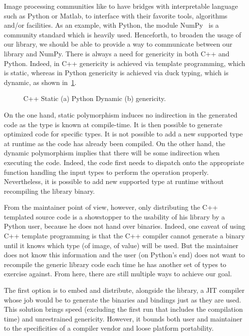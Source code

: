 Image processing communities like to have bridges with interpretable language such as Python or Matlab, to interface
with their favorite tools, algorithms and/or facilities. As an example, with Python, the module
NumPy~\parencite{harris.2020.numpy} is a community standard which is heavily used. Henceforth, to broaden the usage of
our library, we should be able to provide a way to communicate between our library and NumPy. There is always a need for
genericity in both C++ and Python. Indeed, in C++ genericity is achieved via template programming, which is static,
whereas in Python genericity is achieved via duck typing, which is dynamic, as shown
in~\cref{fig:static.vs.dynamic.genericity}.

\begin{figure}[htbp]
  \centering
  \hfil
  \caption{C++ Static (a) \vs Python Dynamic (b) genericity.}
  \label{fig:static.vs.dynamic.genericity}
\end{figure}

On the one hand, static polymorphism induces no indirection in the generated code as the type is known at compile-time.
It is then possible to generate optimized code for specific types. It is not possible to add a new supported type at
runtime as the code has already been compiled. On the other hand, the dynamic polymorphism implies that there will be
some indirection when executing the code. Indeed, the code first needs to dispatch onto the appropriate function
handling the input types to perform the operation properly. Nevertheless, it is possible to add new supported type at
runtime without recompiling the library binary.

From the maintainer point of view, however, only distributing the C++ templated source code is a showstopper to the
usability of his library by a Python user, because he does not hand over binaries. Indeed, one caveat of using C++
template programming is that the C++ compiler cannot generate a binary until it knows which type (of image, of value)
will be used. But the maintainer does not know this information and the user (on Python's end) does not want to
recompile the generic library code each time he has another set of types to exercise against. From here, there are still
multiple ways to achieve our goal.

The first option is to embed and distribute, alongside the library, a JIT compiler whose job would be to generate the
binaries and bindings just as they are used. This solution brings speed (excluding the first run that includes the
compilation time) and unrestrained genericity. However, it bounds both user and maintainer to the specificities of a
compiler vendor and loose platform portability.

